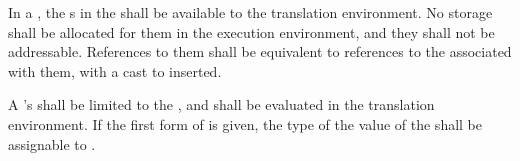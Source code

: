 \specsubsubitem
In a , the s in the
 shall be available to the translation
environment. No storage shall be allocated for them in the execution
environment, and they shall not be addressable. References to them shall be
equivalent to references to the  associated with them,
with a cast to  inserted.

\specsubsubitem
A 's  shall be limited to
the , and shall be evaluated
in the translation environment. If the first form of
 is given, the type of the value of the
 shall be assignable to .


\begin{grammar}
 \\
	  \\

 \\
	 \optional{\terminal{,}} \\
	 \terminal{,}  \\

 \\
	 \terminal{=}  \\
	 \terminal{=}  \\

 \\
	  \terminal{\{}  \terminal{\}} \\

 \\
	 \optional{\terminal{,}} \\
	 \terminal{,}  \\

 \\
	 \\
	 \terminal{=}  \\

 \\
	 \\
	 \\

\end{grammar}

